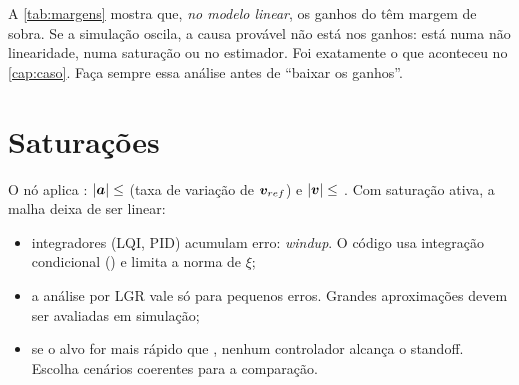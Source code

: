 \begin{dica}
A \cref{tab:margens} mostra que, \emph{no modelo linear}, os ganhos do  têm
margem de sobra. Se a simulação oscila, a causa provável não está nos ganhos: está numa
não linearidade, numa saturação ou no estimador. Foi exatamente o que aconteceu no
\cref{cap:caso}. Faça sempre essa análise antes de ``baixar os ganhos''.
\end{dica}

\section{Saturações}
O nó aplica : $|\bm{a}|\le$  (taxa de variação de
$\bm{v}_{ref}$) e $|\bm{v}|\le$ . Com saturação ativa, a malha deixa de
ser linear:
\begin{itemize}
  \item integradores (LQI, PID) acumulam erro: \emph{windup}. O código usa integração
        condicional () e limita a norma de $\xi$;
  \item a análise por LGR vale só para pequenos erros. Grandes aproximações devem ser
        avaliadas em simulação;
  \item se o alvo for mais rápido que , nenhum controlador alcança o
        standoff. Escolha cenários coerentes para a comparação.
\end{itemize}
